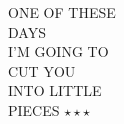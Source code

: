 \documentclass[20pt]{book}
\begin{document}
\clearpage



\clearpage

\vspace*{\fill}
\begin{minipage}{\textwidth}
\large
{}
\end{minipage}
\vspace{\fill}


\clearpage


\clearpage

\clearpage

\clearpage

\clearpage

\clearpage

\newpage
\thispagestyle{empty}
\mbox{}
\newpage

\vspace*{\fill}
\begin{minipage}{\textwidth}
\center
{
ONE OF THESE\\
DAYS\\
I’M GOING TO\\
CUT YOU\\
INTO LITTLE\\
PIECES \small{$\star \star \star$}
}
\end{minipage}
\vspace{\fill}
\end{document}
